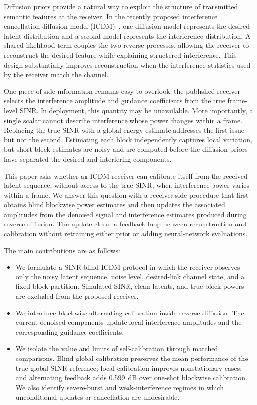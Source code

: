 \documentclass[conference]{IEEEtran}
\begin{document}
Diffusion priors provide a natural way to exploit the structure of
transmitted semantic features at the receiver. In the recently proposed
interference cancellation diffusion model (ICDM)~\cite{wu2026icdm}, one
diffusion model represents the desired latent distribution and a second
model represents the interference distribution. A shared likelihood term
couples the two reverse processes, allowing the receiver to reconstruct the
desired feature while explaining structured interference. This design
substantially improves reconstruction when the interference statistics used
by the receiver match the channel.

One piece of side information remains easy to overlook: the published
receiver selects the interference amplitude and guidance coefficients from
the true frame-level SINR. In deployment, this quantity may be unavailable.
More importantly, a single scalar cannot describe interference whose power
changes within a frame. Replacing the true SINR with a global energy estimate
addresses the first issue but not the second. Estimating each block
independently captures local variation, but short-block estimates are noisy
and are computed before the diffusion priors have separated the desired and
interfering components.

This paper asks whether an ICDM receiver can calibrate itself from the
received latent sequence, without access to the true SINR, when interference
power varies within a frame. We answer this question with a receiver-side
procedure that first obtains blind blockwise power estimates and then updates
the associated amplitudes from the denoised signal and interference estimates
produced during reverse diffusion. The update closes a feedback loop between
reconstruction and calibration without retraining either prior or adding
neural-network evaluations.

The main contributions are as follows:
\begin{itemize}
    \item We formulate a SINR-blind ICDM protocol in which the receiver
    observes only the noisy latent sequence, noise level, desired-link channel
    state, and a fixed block partition. Simulated SINR, clean latents, and
    true block powers are excluded from the proposed receiver.
    \item We introduce blockwise alternating calibration inside reverse
    diffusion. The current denoised components update local interference
    amplitudes and the corresponding guidance coefficients.
    \item We isolate the value and limits of self-calibration through matched
    comparisons. Blind global calibration preserves the mean performance of
    the true-global-SINR reference; local calibration improves nonstationary
    cases; and alternating feedback adds 0.599~dB over one-shot blockwise
    calibration. We also identify severe-burst and weak-interference regimes
    in which unconditional updates or cancellation are undesirable.
\end{itemize}
\end{document}

